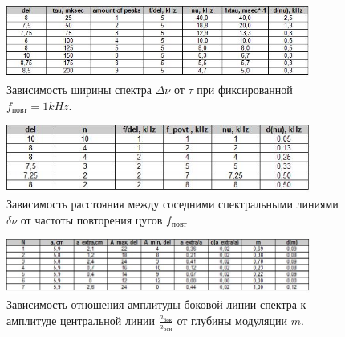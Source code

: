 \documentclass[a4paper,12pt]{article}
\begin{document}
\begin{figure}[htpb]
\centering
\includegraphics[width=100mm]{tableA.jpg}
\caption{Зависимость ширины спектра $\Delta \nu$ от $\tau$ при фиксированной $f_\text{повт} = 1 kHz$.}
\end{figure}

\begin{figure}[htpb]
\centering
\includegraphics[width=100mm]{tableB.jpg}
\caption{Зависимость расстояния между соседними спектральными линиями $\delta \nu$ от частоты повторения цугов $f_\text{повт}$}
\end{figure}

\begin{figure}[htpb]
\centering
\includegraphics[width=100mm]{tableC.jpg}
\caption{Зависимость отношения амплитуды боковой линии спектра к амплитуде центральной линии $\frac{a_\text{бок}}{a_\text{осн}}$ от глубины модуляции $m$.}
\end{figure}
 
\end{document}
